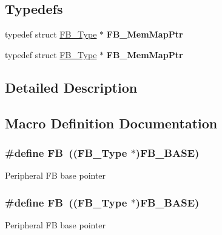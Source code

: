 \subsection*{Typedefs}
\begin{DoxyCompactItemize}
\item 
typedef struct \hyperlink{structFB__Type}{F\+B\+\_\+\+Type} $\ast$ {\bfseries F\+B\+\_\+\+Mem\+Map\+Ptr}\hypertarget{group__FB__Peripheral__Access__Layer_gaf3dd7fbe0b347c71897767ba525a527c}{}\label{group__FB__Peripheral__Access__Layer_gaf3dd7fbe0b347c71897767ba525a527c}

\item 
typedef struct \hyperlink{structFB__Type}{F\+B\+\_\+\+Type} $\ast$ {\bfseries F\+B\+\_\+\+Mem\+Map\+Ptr}\hypertarget{group__FB__Peripheral__Access__Layer_gaf3dd7fbe0b347c71897767ba525a527c}{}\label{group__FB__Peripheral__Access__Layer_gaf3dd7fbe0b347c71897767ba525a527c}

\end{DoxyCompactItemize}


\subsection{Detailed Description}


\subsection{Macro Definition Documentation}
\subsubsection[{\texorpdfstring{FB}{FB}}]{\setlength{\rightskip}{0pt plus 5cm}\#define FB~(({\bf F\+B\+\_\+\+Type} $\ast$){\bf F\+B\+\_\+\+B\+A\+SE})}\hypertarget{group__FB__Peripheral__Access__Layer_gafa56f653aa38688ca538ba26fcde993c}{}\label{group__FB__Peripheral__Access__Layer_gafa56f653aa38688ca538ba26fcde993c}
Peripheral FB base pointer 
\subsubsection[{\texorpdfstring{FB}{FB}}]{\setlength{\rightskip}{0pt plus 5cm}\#define FB~(({\bf F\+B\+\_\+\+Type} $\ast$){\bf F\+B\+\_\+\+B\+A\+SE})}\hypertarget{group__FB__Peripheral__Access__Layer_gafa56f653aa38688ca538ba26fcde993c}{}\label{group__FB__Peripheral__Access__Layer_gafa56f653aa38688ca538ba26fcde993c}
Peripheral FB base pointer 
